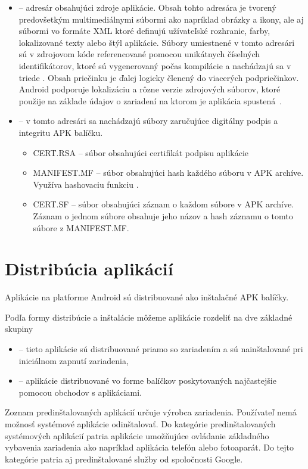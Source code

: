 \begin{itemize}
	\item {} -- adresár obsahujúci zdroje aplikácie. Obsah tohto adresára je tvorený predovšetkým multimediálnymi súbormi ako napríklad obrázky a ikony, ale aj súbormi vo formáte XML ktoré definujú užívateľské rozhranie, farby, lokalizované texty alebo štýl aplikácie. Súbory umiestnené v tomto adresári sú v zdrojovom kóde referencované pomocou unikátnych číselných identifikátorov, ktoré sú vygenerovaný počas kompilácie a nachádzajú sa v triede . Obsah priečinku je ďalej logicky členený do viacerých podpriečinkov. Android podporuje lokalizáciu a rôzne verzie zdrojových súborov, ktoré použije na základe údajov o zariadení na ktorom je aplikácia spustená~\cite{Resources}.
	
	\item {} -- v tomto adresári sa nachádzajú súbory zaručujúce digitálny podpis a integritu APK balíčku. 
		\begin{itemize}
			\item CERT.RSA  -- súbor obsahujúci certifikát podpisu aplikácie
			\item MANIFEST.MF  -- súbor obsahujúci hash každého súboru v APK archíve. Využíva hashovaciu funkciu .
			\item CERT.SF  -- súbor obsahujúci záznam o každom súbore v APK archíve. Záznam o jednom súbore obsahuje jeho názov a  hash záznamu o tomto súbore z MANIFEST.MF.
		\end{itemize}		
		
		
\end{itemize} 


\section{Distribúcia aplikácií}
Aplikácie na platforme Android sú distribuované ako inštalačné APK balíčky. 

Podľa formy distribúcie a inštalácie môžeme aplikácie rozdeliť na dve základné skupiny
\begin{itemize}
 \item {} -- tieto aplikácie sú distribuované priamo so zariadením a sú nainštalované pri iniciálnom zapnutí zariadenia,
 \item {} -- aplikácie distribuované vo forme balíčkov poskytovaných najčastejšie pomocou obchodov s aplikáciami.
\end{itemize}

Zoznam predinštalovaných aplikácií určuje výrobca zariadenia. Používateľ nemá možnosť systémové aplikácie odinštalovať. Do kategórie predinštalovaných systémových aplikácií patria aplikácie umožňujúce ovládanie základného vybavenia zariadenia ako napríklad aplikácia telefón alebo fotoaparát. Do tejto kategórie patria aj predinštalované služby od spoločnosti Google. 

